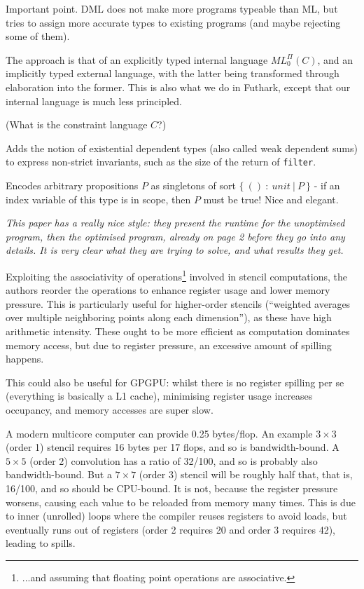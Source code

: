 \documentclass[a4paper, oneside, final]{memoir}
\begin{document}
Important point. DML does not make more programs typeable than ML, but
tries to assign more accurate types to existing programs (and maybe
rejecting some of them).

The approach is that of an explicitly typed internal language
$ML_{0}^{\Pi}(C)$, and an implicitly typed external language, with the
latter being transformed through elaboration into the former.  This is
also what we do in Futhark, except that our internal language is much
less principled.

(What is the constraint language $C$?)

Adds the notion of existential dependent types (also called weak
dependent sums) to express non-strict invariants, such as the size of
the return of \texttt{filter}.

Encodes arbitrary propositions $P$ as singletons of sort $\{\ ()\ :\
unit\ |\ P\ \}$ - if an index variable of this type is in scope, then
$P$ must be true!  Nice and elegant.

\begin{quote}
\end{quote}

\textit{This paper has a really nice style: they present the runtime
  for the unoptimised program, then the optimised program, already on
  page 2 before they go into any details.  It is very clear what they
  are trying to solve, and what results they get.}

Exploiting the associativity of operations\footnote{...and assuming
  that floating point operations are associative.} involved in stencil
computations, the authors reorder the operations to enhance register
usage and lower memory pressure.  This is particularly useful for
higher-order stencils (``weighted averages over multiple neighboring
points along each dimension''), as these have high arithmetic
intensity.  These ought to be more efficient as computation dominates
memory access, but due to register pressure, an excessive amount of
spilling happens.

This could also be useful for GPGPU: whilst there is no register
spilling per se (everything is basically a L1 cache), minimising
register usage increases occupancy, and memory accesses are super
slow.

A modern multicore computer can provide 0.25 bytes/flop.  An example
$3 \times 3$ (order 1) stencil requires 16 bytes per 17 flops, and so
is bandwidth-bound.  A $5 \times 5$ (order 2) convolution has a ratio
of 32/100, and so is probably also bandwidth-bound.  But a $7 \times
7$ (order 3) stencil will be roughly half that, that is, 16/100, and
so should be CPU-bound.  It is not, because the register pressure
worsens, causing each value to be reloaded from memory many times.
This is due to inner (unrolled) loops where the compiler reuses
registers to avoid loads, but eventually runs out of registers (order
2 requires 20 and order 3 requires 42), leading to spills.
\end{document}
